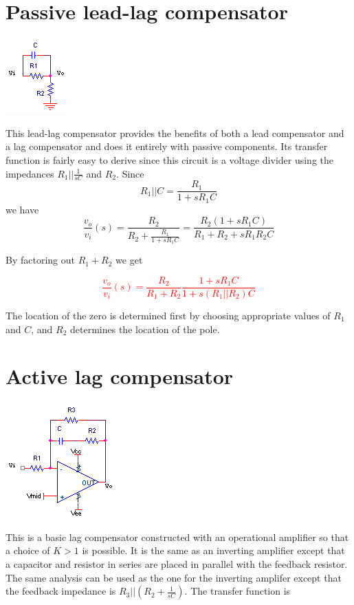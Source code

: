 \section{Passive lead-lag compensator}
\begin{center}
	\includegraphics{schematics/passiveleadlag.PNG}
\end{center}
This lead-lag compensator provides the benefits of both a lead compensator and a lag compensator and does it entirely with passive components. Its transfer function is fairly easy to derive since this circuit is a voltage divider using the impedances $R_{1}||\frac{1}{sC}$ and $R_{2}$. Since
\begin{equation}
R_{1}||C = \frac{R_{1}}{1+sR_{1}C}
\end{equation}
we have
\begin{equation}
\frac{v_{o}}{v_{i}}(s) = \frac{R_{2}}{R_{2} + \frac{R_{1}}{1+sR_{1}C}} = \frac{R_{2}(1+sR_{1}C)}{R_{1} + R_{2} + sR_{1}R_{2}C}
\end{equation}

By factoring out $R_{1}+R_{2}$ we get

\textcolor{red}{
\begin{equation}
\frac{v_{o}}{v_{i}}(s) = \frac{R_{2}}{R_{1}+R_{2}}\frac{1+sR_{1}C}{1+s(R_{1}||R_{2})C}
\label{eq:passiveleadlag}
\end{equation}
}

The location of the zero is determined first by choosing appropriate values of $R_{1}$ and $C$, and $R_{2}$ determines the location of the pole.

\section{Active lag compensator}
\begin{center}
	\includegraphics{schematics/activelag.PNG}
\end{center}
This is a basic lag compensator constructed with an operational amplifier so that a choice of $K > 1$ is possible. It is the same as an inverting amplifier except that a capacitor and resistor in series are placed in parallel with the feedback resistor. The same analysis can be used as the one for the inverting amplifer except that the feedback impedance is $R_{3}||(R_{2}+\frac{1}{sC})$. The transfer function is

